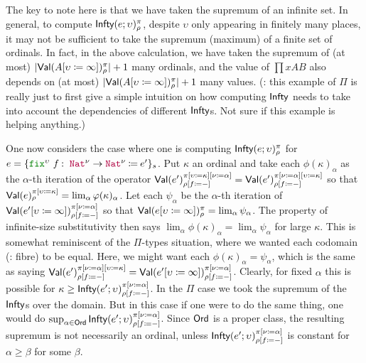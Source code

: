 The key to note here is that we have taken the supremum of an infinite set.
%
In general, to compute $\textsf{Infty}(e;\upsilon)_\rho^\pi$, despite
$\upsilon$ only appearing in finitely many places, it may not be
sufficient to take the supremum (maximum) of a finite set of ordinals.
%
In fact, in the above calculation, we have taken the supremum of (at
most) $\lvert\textsf{Val}(A [\upsilon \coloneqq \infty])_\rho^\pi\rvert+1$ many
ordinals, and the value of $\prod{x}{A}{B}$ also depends on (at most)
$\lvert\textsf{Val}(A [\upsilon \coloneqq \infty])_\rho^\pi\rvert+1$ many values.
%
(\todo: this example of $\Pi$ is really just to first give a simple
intuition on how computing $\textsf{Infty}$ needs to take into account the
dependencies of different $\textsf{Infty}$s. Not sure if this example is
helping anything.)

One now considers the case where one is computing
$\textsf{Infty}(e;\upsilon)_\rho^\pi$ for
$e = \fixE{\upsilon}{f}{\Nat^\nu \rightarrow \Nat^\nu}{e'}{s}$.
%
Put $\kappa$ an ordinal and take each $\phi(\kappa)_\alpha$ as the
$\alpha$-th iteration of the operator
$\textsf{Val}(e')_{\rho [f \coloneqq -]}^{\pi [\upsilon \coloneqq \kappa] [\nu \coloneqq \alpha]}
=
\textsf{Val}(e')_{\rho [f \coloneqq -]}^{\pi [\nu \coloneqq \alpha] [\upsilon \coloneqq \kappa]}$
so that
$\textsf{Val}(e)_\rho^{\pi [\upsilon \coloneqq \kappa]} =
\lim_\alpha \varphi(\kappa)_\alpha$.
%
Let each $\psi_\alpha$ be the $\alpha$-th iteration of
$\textsf{Val}(e' [\upsilon \coloneqq \infty])_{\rho [f \coloneqq -]}^{\pi [\nu \coloneqq \alpha]}$
so that
$\textsf{Val}(e [\upsilon \coloneqq \infty])_\rho^{\pi} =
\lim_\alpha \psi_\alpha$.
%
The property of infinite-size substitutivity then says
$\lim_\alpha \phi(\kappa)_\alpha = \lim_\alpha \psi_\alpha$
for large $\kappa$.
%
This is somewhat reminiscent of the $\Pi$-types situation, where we
wanted each codomain (\todo: fibre) to be equal.
%
Here, we might want each $\phi(\kappa)_\alpha=\psi_\alpha$,
which is the same as saying
$\textsf{Val}(e')_{\rho [f \coloneqq -]}^{\pi [\nu \coloneqq \alpha] [\upsilon \coloneqq \kappa]}
=
\textsf{Val}(e' [\upsilon \coloneqq \infty])_{\rho [f \coloneqq -]}^{\pi [\nu \coloneqq \alpha]}$.
%
Clearly, for fixed $\alpha$ this is possible for
$\kappa \geq \textsf{Infty}(e';\upsilon)_{\rho [f \coloneqq -]}^{\pi [\nu \coloneqq \alpha]}$.
%
In the $\Pi$ case we took the supremum of the $\textsf{Infty}$s over the
domain.
%
But in this case if one were to do the same thing, one would
do $\sup_{\alpha \in \textsf{Ord}}
{\textsf{Infty}(e';\upsilon)_{\rho [f \coloneqq -]}^{\pi [\nu \coloneqq \alpha]}}$.
%
Since $\textsf{Ord}$ is a proper class, the resulting supremum is not
necessarily an ordinal, unless
$\textsf{Infty}(e';\upsilon)_{\rho [f \coloneqq -]}^{\pi [\nu \coloneqq \alpha]}$
is constant for $\alpha \geq \beta$ for some $\beta$.

